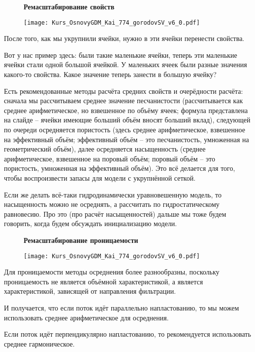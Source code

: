 \begin{figure}[H]
\textbf{Ремасштабирование свойств}

\texttt{[image: Kurs\_OsnovyGDM\_Kai\_774\_gorodovSV\_v6\_0.pdf]}
\end{figure}

После того, как мы укрупнили ячейки, нужно в эти ячейки перенести свойства.

Вот у нас пример здесь: были такие маленькие ячейки, теперь эти маленькие ячейки стали одной большой ячейкой. У маленьких ячеек были разные значения какого-то свойства. Какое значение теперь занести в большую ячейку?

Есть рекомендованные методы расчёта средних свойств и очерёдности расчёта: сначала мы рассчитываем среднее значение песчанистости (рассчитывается как среднее арифметическое, но взвешенное по объёму ячеек; формула представлена на слайде -- ячейки имеющие больший объём вносят больший вклад), следующей по очереди осредняется пористость (здесь среднее арифметическое, взвешенное на эффективный объём; эффективный объём -- это песчанистость, умноженная на геометрический объём), далее осредняется насыщенность (среднее арифметическое, взвешенное на поровый объём; поровый объём -- это пористость, умноженная на эффективный объём).
Это всё делается для того, чтобы воспроизвести запасы для модели с укрупнённой сеткой.

Если же делать всё-таки гидродинамически уравновешенную модель, то насыщенность можно не осреднять, а рассчитать по гидростатическому равновесию.
Про это (про расчёт насыщенностей) дальше мы тоже будем говорить, когда будем обсуждать инициализацию модели.
\\

\begin{figure}[H]
\textbf{Ремасштабирование проницаемости}

\texttt{[image: Kurs\_OsnovyGDM\_Kai\_774\_gorodovSV\_v6\_0.pdf]}
\end{figure}

Для проницаемости методы осреднения более разнообразны, поскольку проницаемость не является объёмной характеристикой, а является характеристикой, зависящей от направления фильтрации.

И получается, что если поток идёт параллельно напластованию, то мы можем использовать среднее арифметическое для осреднения.

Если поток идёт перпендикулярно напластованию, то рекомендуется использовать среднее гармоническое.

